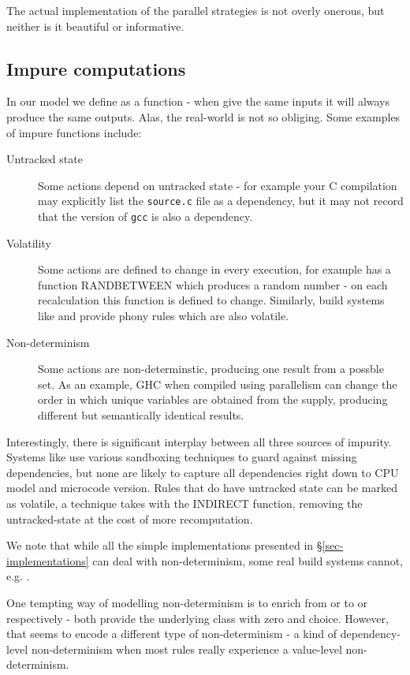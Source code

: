 The actual implementation of the parallel strategies is not overly onerous, but neither is it beautiful or informative.

\subsection{Impure computations}\label{sec-non-determinism}

In our model we define  as a function - when give the same inputs it will always produce the same outputs. Alas, the real-world is not so obliging. Some examples of impure  functions include:

\begin{description}
\item[Untracked state] Some actions depend on untracked state - for example your C compilation may explicitly list the \texttt{source.c} file as a dependency, but it may not record that the version of \texttt{gcc} is also a dependency.
\item[Volatility] Some actions are defined to change in every execution, for example \Excel has a function \textsf{RANDBETWEEN} which produces a random number - on each recalculation this function is defined to change. Similarly, build systems like \Make and \Shake provide \textsf{phony} rules which are also volatile.
\item[Non-determinism] Some actions are non-determinstic, producing one result from a possble set. As an example, GHC when compiled using parallelism can change the order in which unique variables are obtained from the supply, producing different but semantically identical results.
\end{description}

Interestingly, there is significant interplay between all three sources of impurity. Systems like \Bazel use various sandboxing techniques to guard against missing dependencies, but none are likely to capture all dependencies right down to CPU model and microcode version. Rules that do have untracked state can be marked as volatile, a technique \Excel takes with the \textsf{INDIRECT} function, removing the untracked-state at the cost of more recomputation.

We note that while all the simple implementations presented in \S\ref{sec-implementations} can deal with non-determinism, some real build systems cannot, e.g. \Buck.

One tempting way of modelling non-determinism is to enrich  from  or  to  or  respectively - both provide the underlying class with zero and choice. However, that seems to encode a different type of non-determinism - a kind of dependency-level non-determinism when most rules really experience a value-level non-determinism.

